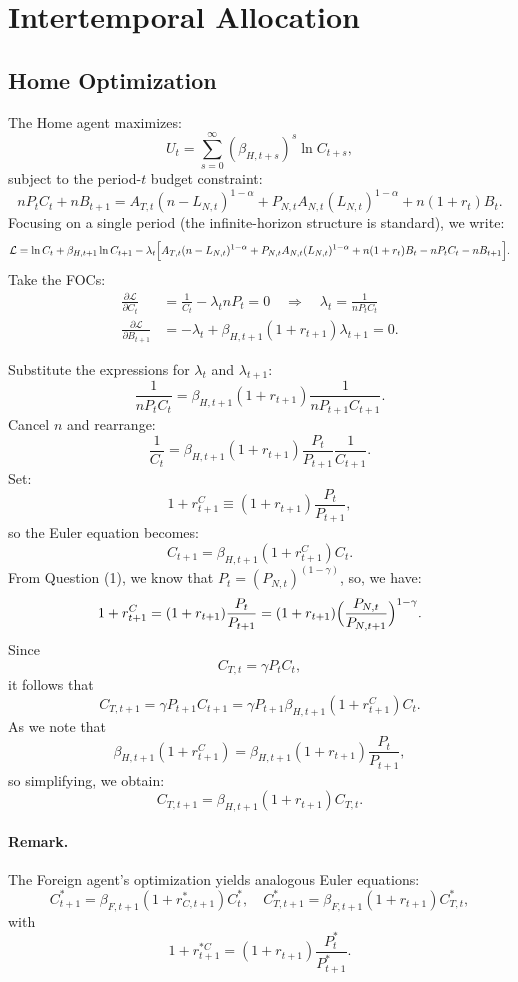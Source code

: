 \documentclass[a4paper,12pt]{article} %
\theoremstyle{nonitalic}
\begin{document}
\section{Intertemporal Allocation}

\subsection*{Home Optimization}
The Home agent maximizes:
\[
U_t = \sum_{s=0}^{\infty} (\beta_{H,t+s})^s \ln C_{t+s},
\]
subject to the period-$ t $ budget constraint:
\[
n P_t C_t + n B_{t+1} = A_{T,t} (n-L_{N,t})^{ 1-\alpha} + P_{N,t} A_{N,t} (L_{N,t})^{ 1-\alpha} + n(1+r_t)B_t.
\]
Focusing on a single period (the infinite-horizon structure is standard), we write:
\[
\mathcal{L} = \ln C_t + \beta_{H,t+1}\ln C_{t+1} - \lambda_t \Bigl[A_{T,t}(n-L_{N,t})^{1-\alpha} + P_{N,t}A_{N,t}(L_{N,t})^{1-\alpha} + n(1+r_t)B_t - n P_t C_t - n B_{t+1}\Bigr].
\]
Take the FOCs:
\begin{align*}
    \frac{\partial \mathcal{L}}{\partial C_t} &= \frac{1}{C_t} - \lambda_t nP_t = 0 \quad \Rightarrow \quad \lambda_t = \frac{1}{nP_t C_t} \\
    \frac{\partial \mathcal{L}}{\partial B_{t+1}} &= -\lambda_t + \beta_{H,t+1}(1+r_{t+1}) \lambda_{t+1} = 0.
\end{align*}

Substitute the expressions for \(\lambda_t\) and \(\lambda_{t+1}\):
\[
\frac{1}{nP_t C_t} = \beta_{H,t+1}(1+r_{t+1})\frac{1}{nP_{t+1} C_{t+1}}.
\]
Cancel \(n\) and rearrange:
\[
\frac{1}{C_t} = \beta_{H,t+1}(1+r_{t+1})\frac{P_t}{P_{t+1}}\frac{1}{C_{t+1}}.
\]
Set:
\[
1 + r_{t+1}^C \equiv (1+r_{t+1})\frac{P_t}{P_{t+1}},
\]
so the Euler equation becomes:
\[
\boxed{C_{t+1} = \beta_{H,t+1}(1+r_{t+1}^C)  C_t.}
\]
From Question (1), we know that $P_t = (P_{N,t})^{(1-\gamma)}$,
so, we have:
\[
1 + r_{t+1}^C = (1+r_{t+1})\frac{P_t}{P_{t+1}} = (1+r_{t+1})\Bigl(\frac{P_{N,t}}{P_{N,t+1}}\Bigr)^{1-\gamma}.
\]
Since
\[
C_{T,t} = \gamma P_t C_t,
\]
it follows that
\[
C_{T,t+1} = \gamma P_{t+1} C_{t+1} = \gamma P_{t+1} \beta_{H,t+1}(1+r_{t+1}^C) C_t.
\]
As we note that
\[
\beta_{H,t+1}(1+r_{t+1}^C) = \beta_{H,t+1}(1+r_{t+1})\frac{P_t}{P_{t+1}},
\]
so simplifying, we obtain:
\[
\boxed{C_{T,t+1} = \beta_{H,t+1}(1+r_{t+1})  C_{T,t}.}
\]

\paragraph{Remark.}  
The Foreign agent's optimization yields analogous Euler equations:
\[
C^*_{t+1} = \beta_{F,t+1}(1+r^*_{C,t+1})  C^*_t,\quad
C^*_{T,t+1} = \beta_{F,t+1}(1+r_{t+1})  C^*_{T,t},
\]
with
\[
1+r_{t+1}^{*C} = (1+r_{t+1})\frac{P^*_t}{P^*_{t+1}}.
\]
\end{document}
